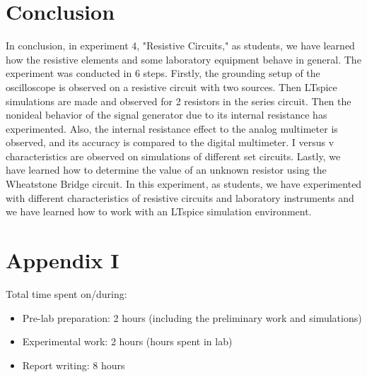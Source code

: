 \documentclass[letterpaper,12pt]{article}
\begin{document}
\section{Conclusion}
In conclusion, in experiment 4, "Resistive Circuits," as students, we have learned how the resistive elements and some laboratory equipment behave in general. The experiment was conducted in 6 steps. Firstly, the grounding setup of the oscilloscope is observed on a resistive circuit with two sources. Then LTspice simulations are made and observed for 2 resistors in the series circuit. Then the nonideal behavior of the signal generator due to its internal resistance has experimented. Also, the internal resistance effect to the analog multimeter is observed, and its accuracy is compared to the digital multimeter. I versus v characteristics are observed on simulations of different set circuits. Lastly, we have learned how to determine the value of an unknown resistor using the Wheatstone Bridge circuit.  In this experiment, as students, we have experimented with different characteristics of resistive circuits and laboratory instruments and we have learned how to work with an LTspice simulation environment.
\section*{Appendix I}
Total time spent on/during:
\begin{itemize}
	\item Pre-lab preparation: 2 hours (including the preliminary work and simulations) 
	\item Experimental work: 2 hours (hours spent in lab)
	\item Report writing: 8 hours 
\end{itemize}



\end{document}
